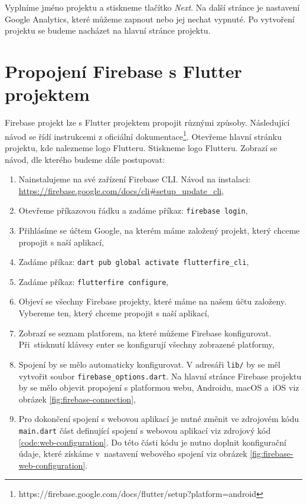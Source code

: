 \documentclass[czech, bc, kiv, he, iso690numb]{fasthesis}
\begin{document}
Vyplníme jméno projektu a stiskneme tlačítko \textit{Next}. Na další stránce je nastavení Google Analytics, které můžeme zapnout nebo jej nechat vypnuté. Po vytvoření projektu se budeme nacházet na hlavní stránce projektu.

\section{Propojení Firebase s Flutter projektem} \label{sec:flutter-connection}

Firebase projekt lze s Flutter projektem propojit různými způsoby. Následující návod se řídí instrukcemi z oficiální dokumentace\footnote{https://firebase.google.com/docs/flutter/setup?platform=android}. Otevřeme hlavní stránku projektu, kde nalezneme logo Flutteru. Stiskneme logo Flutteru. Zobrazí se návod, dle kterého budeme dále postupovat:

\begin{enumerate}[label=\arabic*.]
    \item Nainstalujeme na své zařízení Firebase \gls{CLI}. Návod na instalaci: \url{https://firebase.google.com/docs/cli#setup_update_cli},
    \item Otevřeme příkazovou řádku a zadáme příkaz: \texttt{firebase login},
    \item Přihlásíme se účtem Google, na kterém máme založený projekt, který chceme propojit s naší aplikací,
    \item Zadáme příkaz: \texttt{dart pub global activate flutterfire\_cli},
    \item Zadáme příkaz: \texttt{flutterfire configure},
    \item Objeví se všechny Firebase projekty, které máme na našem účtu založeny. Vybereme ten, který chceme propojit s naší aplikací,
    \item Zobrazí se seznam platforem, na které můžeme Firebase konfigurovat. Při~stisknutí klávesy enter se konfigurují všechny zobrazené platformy,
    \item Spojení by se mělo automaticky konfigurovat. V adresáři \texttt{lib/} by se měl vytvořit soubor \texttt{firebase\_options.dart}. Na hlavní stránce Firebase projektu by se mělo objevit propojení s platformou webu, Androidu, macOS a~iOS viz obrázek \ref{fig:firebase-connection},
    \item Pro dokončení spojení s webovou aplikací je nutné změnit ve zdrojovém kódu \texttt{main.dart} část definující spojení s webovou aplikací viz zdrojový kód \ref{code:web-configuration}. Do této části kódu je nutno doplnit konfigurační údaje, které získáme v~nastavení webového spojení viz obrázek \ref{fig:firebase-web-configuration}.
\end{enumerate}
\end{document}
